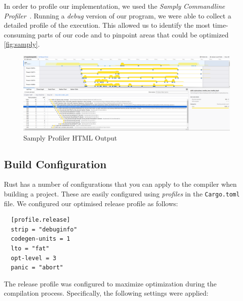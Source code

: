 \documentclass[11pt]{report}
\theoremstyle{definition}
\theoremstyle{plain}
\begin{document}
In order to profile our implementation, we used the \textit{Samply Commandline Profiler}~\cite{samply}. Running a \textit{debug} version of our program, we were able to collect a detailed profile of the execution. This allowed us to identify the most time-consuming parts of our code and to pinpoint areas that could be optimized \autoref{fig:samply}.

\begin{figure}[H]
  \centering
  \includegraphics[width=\textwidth]{images/samply.png}
  \caption{Samply Profiler HTML Output}
  \label{fig:samply}
\end{figure}

\subsection{Build Configuration}

Rust has a number of configurations that you can apply to the compiler when building a project. These are easily configured using \textit{profiles} in the \texttt{Cargo.toml} file. We configured our optimised release profile as follows:

\begin{verbatim}
  [profile.release]
  strip = "debuginfo"
  codegen-units = 1  
  lto = "fat"        
  opt-level = 3      
  panic = "abort"
\end{verbatim}

The release profile was configured to maximize optimization during the compilation process. Specifically, the following settings were applied:
\end{document}
